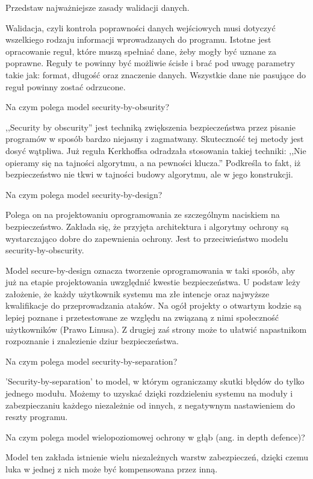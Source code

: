\documentclass[answers,11pt]{exam}
\begin{document}
\begin{questions}
\question Przedstaw najważniejsze zasady walidacji danych.
\begin{solution}
Walidacja, czyli kontrola poprawności danych wejściowych musi dotyczyć wszelkiego rodzaju informacji wprowadzanych do programu. Istotne jest opracowanie reguł, które muszą spełniać dane, żeby mogły być uznane za poprawne. Reguły te powinny być możliwie ścisłe i brać pod uwagę parametry takie jak: format, długość oraz znaczenie danych. Wszystkie dane nie pasujące do reguł powinny zostać odrzucone.  
\end{solution}

\question Na czym polega model security-by-obsurity?
\begin{solution}
,,Security by obscurity'' jest techniką zwiększenia bezpieczeństwa przez pisanie programów w sposób bardzo niejasny i zagmatwany. Skuteczność tej metody jest dosyć wątpliwa.
Już reguła Kerkhoffsa odradzała stosowania takiej techniki: ,,Nie opieramy się na tajności algorytmu, a na pewności klucza.'' Podkreśla to fakt, iż bezpieczeństwo nie tkwi w tajności budowy algorytmu, ale w jego konstrukcji.
\end{solution}

\question Na czym polega model security-by-design?
\begin{solution}
Polega on na projektowaniu oprogramowania ze szczególnym naciskiem na bezpieczeństwo. Zakłada się, że przyjęta architektura i algorytmy ochrony są wystarczająco dobre do zapewnienia ochrony. Jest to przeciwieństwo modelu security-by-obscurity.

Model secure-by-design oznacza tworzenie oprogramowania w taki sposób, aby już na etapie projektowania uwzględnić kwestie bezpieczeństwa. U podstaw leży założenie, że każdy użytkownik systemu ma złe intencje oraz najwyższe kwalifikacje do przeprowadzania ataków. Na ogół projekty o otwartym kodzie są lepiej poznane i przetestowane ze względu na związaną z nimi społeczność użytkowników (Prawo Linusa).  Z drugiej zaś strony może to ułatwić napastnikom rozpoznanie i znalezienie dziur bezpieczeństwa. 

\end{solution}

\question Na czym polega model security-by-separation?
\begin{solution}
'Security-by-separation' to model, w którym ograniczamy skutki błędów do tylko jednego modułu. Możemy to uzyskać dzięki rozdzieleniu systemu na moduły i zabezpieczaniu każdego  niezależnie od innych, z negatywnym nastawieniem do reszty programu.
\end{solution}

\question Na czym polega model wielopoziomowej ochrony w głąb (ang. in depth defence)?
\begin{solution}
Model ten zakłada istnienie wielu niezależnych warstw zabezpieczeń, dzięki czemu luka w jednej z nich może być kompensowana przez inną. 
\end{solution}
\end{questions}
\end{document}
